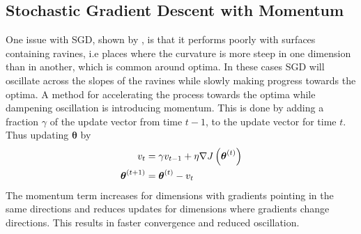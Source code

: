 \subsection{Stochastic Gradient Descent with Momentum}
One issue with SGD, shown by \cite{sutton1986}, is that it performs poorly with surfaces containing ravines, i.e places where the curvature is more steep in one dimension than in another, which is common around optima. In these cases SGD will oscillate across the slopes of the ravines while slowly making progress towards the optima. A method for accelerating the process towards the optima while dampening oscillation is introducing momentum. This is done by adding a fraction $\gamma$ of the update vector from time $t -1$, to the update vector for time $t$. Thus updating $\boldsymbol{\theta}$ by 
\begin{equation*}
    \begin{split}
        v_{t} &= \gamma v_{t -1} + \eta \nabla J \left (\boldsymbol{\theta}^{(t)}\right) \\
        \boldsymbol{\theta}^{(t+1)} &= \boldsymbol{\theta}^{(t)} - v_t
    \end{split}
\end{equation*}
The momentum term increases for dimensions with gradients pointing in the same directions and reduces updates for dimensions where gradients change directions. This results in faster convergence and reduced oscillation.

